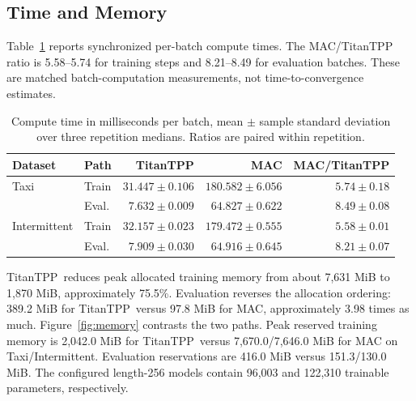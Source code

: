 \documentclass[runningheads]{llncs}
\newcommand{\method}{TitanTPP}
\begin{document}
\subsection{Time and Memory}
Table~\ref{tab:cost} reports synchronized per-batch compute times. The
MAC/TitanTPP ratio is 5.58--5.74 for training steps and 8.21--8.49 for
evaluation batches. These are matched batch-computation measurements, not
time-to-convergence estimates.

\begin{table}[t]
\caption{Compute time in milliseconds per batch, mean $\pm$ sample
standard deviation over three repetition medians. Ratios are paired within
repetition.}
\label{tab:cost}\centering\small
\begin{tabular}{llrrr}
\toprule
Dataset & Path & TitanTPP & MAC & MAC/TitanTPP\\
\midrule
Taxi & Train & $31.447\pm0.106$ & $180.582\pm6.056$ & $5.74\pm0.18$\\
 & Eval. & $7.632\pm0.009$ & $64.827\pm0.622$ & $8.49\pm0.08$\\
Intermittent & Train & $32.157\pm0.023$ & $179.472\pm0.555$ & $5.58\pm0.01$\\
 & Eval. & $7.909\pm0.030$ & $64.916\pm0.645$ & $8.21\pm0.07$\\
\bottomrule
\end{tabular}
\end{table}

\method\ reduces peak allocated training memory from about 7,631 MiB to
1,870 MiB, approximately 75.5\%. Evaluation reverses the allocation ordering:
389.2 MiB for \method\ versus 97.8 MiB for MAC, approximately 3.98 times
as much. Figure~\ref{fig:memory} contrasts the two paths.
Peak reserved training memory is 2,042.0 MiB for \method\ versus
7,670.0/7,646.0 MiB for MAC on Taxi/Intermittent. Evaluation reservations
are 416.0 MiB versus 151.3/130.0 MiB. The configured length-256 models
contain 96,003 and 122,310 trainable parameters, respectively.
\end{document}
